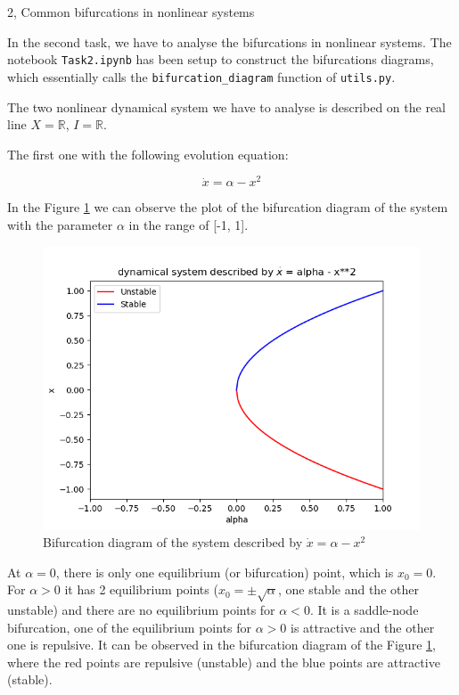 \documentclass[10pt,a4paper]{article}
\begin{document}
\newpage

\begin{task}{2, Common bifurcations in nonlinear systems}

In the second task, we have to analyse the bifurcations in nonlinear systems. The notebook \texttt{Task2.ipynb} has been setup to construct the bifurcations diagrams, which essentially calls the \texttt{bifurcation\_diagram} function of \texttt{utils.py}. 

The two nonlinear dynamical system we have to analyse is described on the real line $X=\mathbb{R}$, $I=\mathbb{R}$. 

\noindent The first one with the following evolution equation: 

\begin{equation}\label{X}
    \dot{x} = {\alpha} - x ^2
\end{equation}

In the Figure \ref{function1} we can observe the plot of the bifurcation diagram of the system with the parameter $\alpha$ in the range of [-1, 1].

\begin{figure} [H]
    \centering
    \includegraphics[width=15cm]{images/function1_task_2.png}
    \caption{Bifurcation diagram of the system described by $\dot{x} = {\alpha} - x ^2$}
    \label{function1}
\end{figure}

At ${\alpha} = 0$, there is only one equilibrium (or bifurcation) point, which is ${x_0} = 0$. For $\alpha > 0$ it has 2 equilibrium points (${x_0} = \pm \sqrt{\alpha}$, one stable and the other unstable) and there are no equilibrium points for $\alpha < 0$. It is a saddle-node bifurcation, one of the equilibrium points for $\alpha > 0$ is attractive and the other one is repulsive. It can be observed in the bifurcation diagram of the Figure \ref{function1}, where the red points are repulsive (unstable) and the blue points are attractive (stable).


\end{task}
\end{document}

